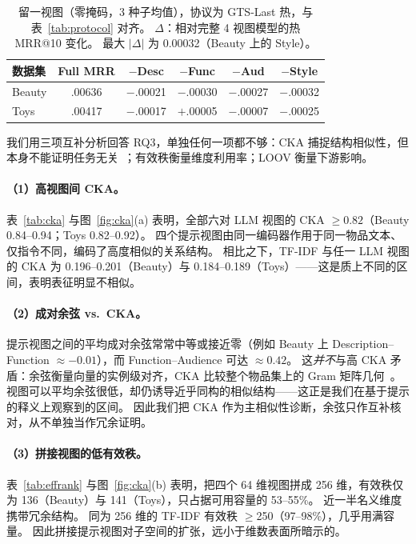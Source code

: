 \documentclass[sigconf,natbib=true,anonymous]{acmart}
\begin{document}
\begin{table}[t]
\centering
\caption{%
留一视图（零掩码，3 种子均值），协议为 GTS-Last 热，与表~\ref{tab:protocol} 对齐。
$\Delta$：相对完整 4 视图模型的热 MRR@10 变化。
最大 $|\Delta|$ 为 0.00032（Beauty 上的 Style）。%
}
\label{tab:loov}
\small
\setlength{\tabcolsep}{3.5pt}
\begin{tabular}{@{}lccccc@{}}
\toprule
数据集 & Full MRR & $-$Desc & $-$Func & $-$Aud & $-$Style \\
\midrule
Beauty & .00636 & $-$.00021 & $-$.00030 & $-$.00027 & $-$.00032 \\
Toys   & .00417 & $-$.00017 & $+$.00005 & $-$.00007 & $-$.00025 \\
\bottomrule
\end{tabular}
\end{table}

我们用三项互补分析回答 RQ3，单独任何一项都不够：CKA 捕捉结构相似性，但本身不能证明任务无关~\cite{kornblith2019cka}；有效秩衡量维度利用率；LOOV 衡量下游影响。

\paragraph{（1）高视图间 CKA。}
表~\ref{tab:cka} 与图~\ref{fig:cka}(a) 表明，全部六对 LLM 视图的 CKA $\ge 0.82$（Beauty 0.84--0.94；Toys 0.82--0.92）。
四个提示视图由同一编码器作用于同一物品文本、仅指令不同，编码了高度相似的关系结构。
相比之下，TF-IDF 与任一 LLM 视图的 CKA 为 0.196--0.201（Beauty）与 0.184--0.189（Toys）——这是质上不同的区间，表明表征明显不相似。

\paragraph{（2）成对余弦 vs.\ CKA。}
提示视图之间的平均成对余弦常常中等或接近零（例如 Beauty 上 Description--Function $\approx -0.01$），而 Function--Audience 可达 $\approx 0.42$。
这\emph{并不}与高 CKA 矛盾：余弦衡量向量的实例级对齐，CKA 比较整个物品集上的 Gram 矩阵几何~\cite{kornblith2019cka}。
视图可以平均余弦很低，却仍诱导近乎同构的相似结构——这正是我们在基于提示的释义上观察到的区间。
因此我们把 CKA 作为主相似性诊断，余弦只作互补核对，从不单独当作冗余证明。

\paragraph{（3）拼接视图的低有效秩。}
表~\ref{tab:effrank} 与图~\ref{fig:cka}(b) 表明，把四个 64 维视图拼成 256 维，有效秩仅为 136（Beauty）与 141（Toys），只占据可用容量的 53--55\%。
近一半名义维度携带冗余结构。
同为 256 维的 TF-IDF 有效秩 $\ge$250（97--98\%），几乎用满容量。
因此拼接提示视图对子空间的扩张，远小于维数表面所暗示的。
\end{document}
